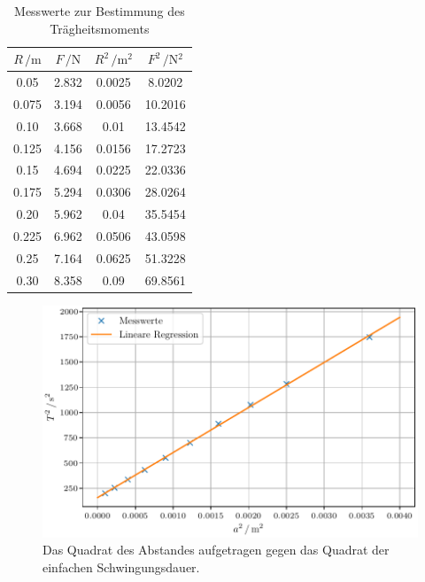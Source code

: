 \begin{table}[H]
  \centering
  \caption{Messwerte zur Bestimmung des Trägheitsmoments}
  \label{tab:Traegheitsmoment}
  \begin{tabular}{
  c c c c
  }
    \toprule
     $R \, / \unit{\meter}$ & $F\, / \unit{\newton}$
      & $R^2 \, / \unit{\meter^2}$ & $F^2\, / \unit{\newton^2}$\\
    \midrule
    0.05  & 2.832 & 0.0025   & 8.0202\\
    0.075 & 3.194 & 0.0056   & 10.2016\\
    0.10  & 3.668 & 0.01     & 13.4542\\
    0.125 & 4.156 & 0.0156   & 17.2723\\
    0.15  & 4.694 & 0.0225   & 22.0336\\
    0.175 & 5.294 & 0.0306   & 28.0264\\
    0.20  & 5.962 & 0.04     & 35.5454\\
    0.225 & 6.962 & 0.0506   & 43.0598\\
    0.25  & 7.164 & 0.0625   & 51.3228\\
    0.30  & 8.358 & 0.09     & 69.8561\\
    \bottomrule
  \end{tabular}
\end{table}
\begin{figure}[H]
  \centering
  \includegraphics[scale=0.6]{plotI_D.pdf}
  \caption{Das Quadrat des Abstandes aufgetragen gegen das Quadrat der einfachen Schwingungsdauer.}
  \label{fig:Plot1}
\end{figure}

